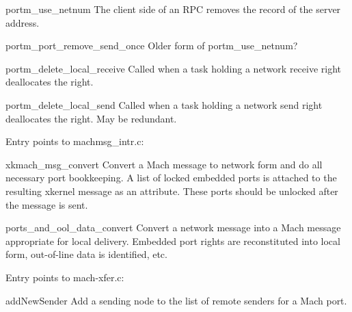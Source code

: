 \begin{description}
\item {portm\_use\_netnum}
The client side of an RPC removes the record of the server address.

\item {portm\_port\_remove\_send\_once}
Older form of portm\_use\_netnum?

\item {portm\_delete\_local\_receive}
Called when a task holding a network receive right deallocates the right.

\item {portm\_delete\_local\_send}
Called when a task holding a network send right deallocates the right.
May be redundant.

\end{description}

Entry points to machmsg_intr.c:
\begin{description}
\item {xkmach\_msg\_convert}
Convert a Mach message to network form and do all necessary port bookkeeping.
A list of locked embedded ports is attached to the resulting xkernel message
as an attribute.  These ports should be unlocked after the message is sent.

\item {ports\_and\_ool\_data\_convert}
Convert a network message into a Mach message appropriate for local delivery.
Embedded port rights are reconstituted into local form, out-of-line data
is identified, etc.
\end{description}

Entry points to mach-xfer.c:
\begin{description}
\item {addNewSender}
Add a sending node to the list of remote senders for a Mach port.

\end{description}


